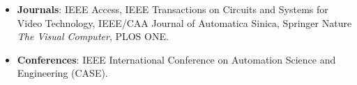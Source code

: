 


\begin{cvparagraph}

    \begin{itemize}
        \item \textbf{Journals}: IEEE Access, IEEE Transactions on Circuits and Systems for Video Technology, IEEE/CAA Journal of Automatica Sinica, Springer Nature \textit{The Visual Computer}, PLOS ONE.
        \item \textbf{Conferences}: IEEE International Conference on Automation Science and Engineering (CASE).
    \end{itemize}

\end{cvparagraph}